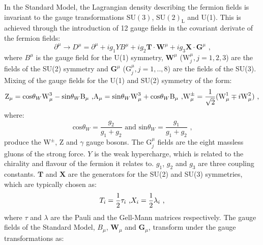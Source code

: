 In the Standard Model, the Lagrangian density describing the fermion fields is invariant to the gauge transformations $\text{SU}(3)$, $\text{SU}(2)_{\text{L}}$ and U(1).  This is achieved through the introduction of 12 gauge fields in the covariant derivate of the fermion fields:
%
\begin{equation}
\partial^{\mu} \rightarrow D^{\mu} = \partial^{\mu} + ig_{1}YB^{\mu} + ig_{2} \textbf{T} \cdot \textbf{W}^{\mu} + ig_{3}\textbf{X} \cdot \textbf{G}^{\mu} \text{ ,}
\end{equation}
%
\noindent where $B^{\mu}$ is the gauge field for the U(1) symmetry, $\textbf{W}^{\mu}$ ($\text{W}^{\mu}_{j}, j =1,2,3$) are the fields of the SU(2) symmetry and $\textbf{G}^{\mu}$ ($\text{G}^{\mu}_{j}, j =1,..,8$) are the fields of the SU(3).  Mixing of the gauge fields for the U(1) and SU(2) symmetry of the form:
%
\begin{equation}
\text{Z}_{\mu} = \text{cos}{\theta_{W}} \text{W}^{3}_{\mu} - \text{sin}{\theta_{W}} \text{B}_{\mu} \text{ ,}\\
\text{A}_{\mu} = \text{sin}{\theta_{W}} \text{W}^{3}_{\mu} + \text{cos}{\theta_{W}} \text{B}_{\mu} \text{ ,}\\
\text{W}^{\pm}_{\mu} = \frac{1}{\sqrt{2}}(\text{W}^{1}_{\mu} \mp i \text{W}^{2}_{\mu}) \text{ ,}
\end{equation}
%
\noindent where:
%
\begin{equation}
\text{cos}{\theta_{W}} = \frac{g_{2}}{g_{1}+g_{2}} \text{ and } \text{sin}{\theta_{W}} = \frac{g_{1}}{g_{1}+g_{2}} \text{ ,}
\end{equation}
%
\noindent produce the $\text{W}^{\pm}$, Z and $\gamma$ gauge bosons.  The $\text{G}^{\mu}_{j}$ fields are the eight massless gluons of the strong force.   $Y$ is the weak hypercharge, which is related to the chirality and flavour of the fermion it relates to.  $g_{1}$, $g_{2}$ and $g_{3}$ are three coupling constants.  $\textbf{T}$ and $\textbf{X}$ are the generators for the SU(2) and SU(3) symmetries, which are typically chosen as:
%
\begin{equation}
T_{i} = \frac{1}{2}\tau_{i} \text{ ,} \\
X_{i} = \frac{1}{2}\lambda_{i} \text{ ,} \\
\end{equation}
%
\noindent where $\tau$ and $\lambda$ are the Pauli and the Gell-Mann matrices respectively.  The gauge fields of the Standard Model, $B_{\mu}$, $\textbf{W}_{\mu}$ and $\textbf{G}_{\mu}$, transform under the gauge transformations as:
